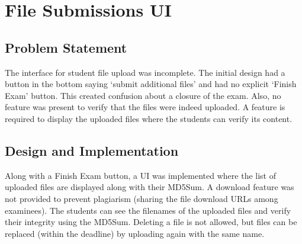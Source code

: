 \section{File Submissions UI}

\subsection{Problem Statement}
The interface for student file upload was incomplete. The initial design had a button in the bottom saying `submit additional files' and had no explicit `Finish Exam' button. This created confusion about a closure of the exam. Also, no feature was present to verify that the files were indeed uploaded. A feature is required to display the uploaded files where the students can verify its content.

\subsection{Design and Implementation}
Along with a Finish Exam button, a UI was implemented where the list of uploaded files are displayed along with their MD5Sum. A download feature was not provided to prevent plagiarism (sharing the file download URLs among examinees). The students can see the filenames of the uploaded files and verify their integrity using the MD5Sum. Deleting a file is not allowed, but files can be replaced (within the deadline) by uploading again with the same name.\\
